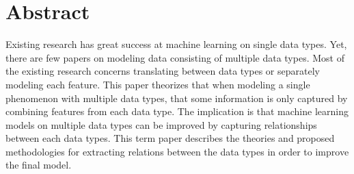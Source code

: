 \section{Abstract}
Existing research has great success at machine learning on single data types.  Yet, there are few papers on modeling data consisting of multiple data types.  Most of the existing research concerns translating between data types or separately modeling each feature.  This paper theorizes that when modeling a single phenomenon with multiple data types, that some information is only captured by combining features from each data type.  The implication is that machine learning models on multiple data types can be improved by capturing relationships between each data types.  This term paper describes the theories and proposed methodologies for extracting relations between the data types in order to improve the final model.
